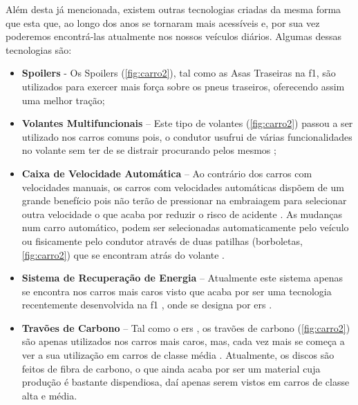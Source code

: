 \documentclass{report}
\begin{document}
Além desta já mencionada, existem outras tecnologias criadas da mesma forma que esta que, ao longo dos anos se tornaram mais acessíveis e, por sua vez poderemos encontrá-las atualmente nos nossos veículos diários.
Algumas dessas tecnologias são:
\begin{itemize}

\item \textbf{Spoilers} - Os Spoilers \cite{f1automoveis} (\autoref{fig:carro2}), tal como as Asas Traseiras \cite{rearwing} na \ac{f1}, são utilizados para exercer mais força sobre os pneus traseiros, oferecendo assim uma melhor tração;

\item \textbf{Volantes Multifuncionais} – Este tipo de volantes (\autoref{fig:carro2}) passou a ser utilizado nos carros comuns pois, o condutor usufrui de várias funcionalidades no volante sem ter de se distrair procurando pelos mesmos \cite{f1automoveis};

\item \textbf{Caixa de Velocidade Automática} – Ao contrário dos carros com velocidades manuais, os carros com velocidades automáticas dispõem de um grande benefício pois não terão de pressionar na embraiagem para selecionar outra velocidade o que acaba por reduzir o risco de acidente \cite{f1automoveis}. As mudanças num carro automático, podem ser selecionadas automaticamente pelo veículo ou fisicamente pelo condutor através de duas patilhas (borboletas, \autoref{fig:carro2}) que se encontram atrás do volante \cite{f1automoveis}.

\item \textbf{Sistema de Recuperação de Energia} – Atualmente este sistema apenas se encontra nos carros mais caros visto que acaba por ser uma tecnologia recentemente desenvolvida na \ac{f1} \cite{f1automoveis}, onde se designa por \ac{ers} \cite{ers}. 

\item \textbf{Travões de Carbono} – Tal como o \ac{ers} \cite{ers}, os travões de carbono (\autoref{fig:carro2}) são apenas utilizados nos carros mais caros, mas, cada vez mais se começa a ver a sua utilização em carros de classe média \cite{f1automoveis}. Atualmente, os discos são feitos de fibra de carbono, o que ainda acaba por ser um material cuja produção é bastante dispendiosa, daí apenas serem vistos em carros de classe alta e média.\\[1cm]


\end{itemize}
\end{document}
